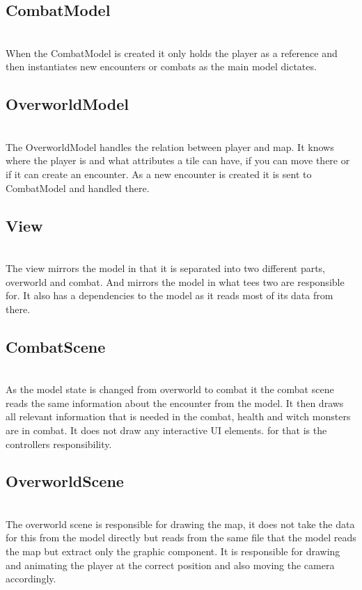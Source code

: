 \subsection{CombatModel}
\label{combatmodel}
\\
When the CombatModel is created it only holds the player as a reference and then instantiates new encounters or combats as the main model dictates.

\subsection{OverworldModel}
\label{overworldmodel}
\\
The OverworldModel handles the relation between player and map. It knows where the player is and what attributes a tile can have, if you can move there or if it can create an encounter. As a new encounter is created it is sent to CombatModel and handled there.

\subsection{View}
\label{view}
\\
The view mirrors the model in that it is separated into two different parts, overworld and combat. And mirrors the model in what tees two are responsible for. It also has a dependencies to the model as it reads most of its data from there.

\subsection{CombatScene}
\label{combatscene}

\\As the model state is changed from overworld to combat it the combat scene reads the same information about the encounter from the model. It then draws all relevant information that is needed in the combat, health and witch monsters are in combat. It does not draw any interactive UI elements. for that is the controllers responsibility.
\subsection{OverworldScene}
\label{overworldscene}

\\The overworld scene is responsible for drawing the map, it does not take the data for this from the model directly but reads from the same file that the model reads the map but extract only the graphic component. It is responsible for drawing and animating the player at the correct position and also moving the camera accordingly.



